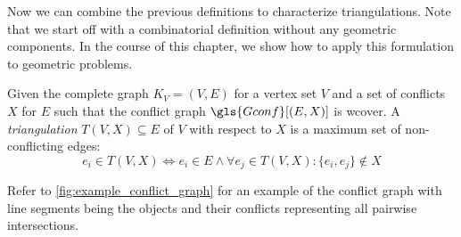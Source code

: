 Now we can combine the previous definitions to characterize
triangulations. Note that we start off with a combinatorial
definition without any geometric components. In the course of this
chapter, we show how to apply this formulation to geometric problems.

\begin{definition}[Triangulation]
  Given the complete graph \(K_V = (V,E)\) for a vertex set \(V\)
  and a set of conflicts \(X\) for \(E\)
  such that the conflict graph \(\gls{Gconf}[(E,X)]\) is \gls{wcover}.
  A \emph{triangulation} \(T(V,X) \subseteq E\) of \(V\) with respect
  to \(X\) is a maximum set of non-conflicting edges:
  \[
    e_i \in T(V,X)
    \iff e_i \in E
    \land \forall e_j \in T(V,X) : \{e_i,e_j\} \not\in X
  \]
\end{definition}

Refer to \cref{fig:example_conflict_graph} for an example of the
conflict graph with line segments being the objects and their
conflicts representing all pairwise intersections.

